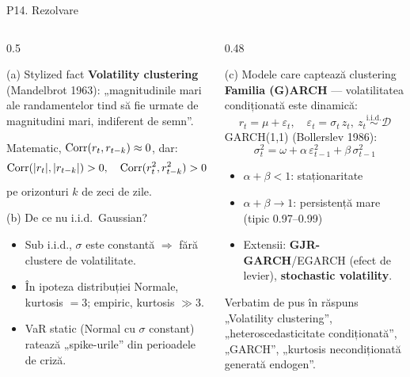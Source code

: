 \documentclass[9pt, aspectratio=169, t]{beamer}
\begin{document}
\begin{frame}[shrink=22]{P14. Rezolvare}
\begin{columns}[T]
\begin{column}{0.5\textwidth}
\begin{block}{(a) Stylized fact}
\textbf{Volatility clustering} (Mandelbrot 1963): „magnitudinile mari ale randamentelor tind să fie urmate de magnitudini mari, indiferent de semn''.

Matematic, $\text{Corr}(r_t,r_{t-k})\approx 0$, dar:
\[
\text{Corr}(|r_t|,|r_{t-k}|) > 0,\quad \text{Corr}(r_t^2,r_{t-k}^2) > 0
\]
pe orizonturi $k$ de zeci de zile.
\end{block}
\begin{block}{(b) De ce nu i.i.d.\ Gaussian?}
\begin{itemize}\setlength{\itemsep}{0pt}
\item Sub i.i.d., $\sigma$ este constantă $\Rightarrow$ fără clustere de volatilitate.
\item În ipoteza distribuției Normale, kurtosis $=3$; empiric, kurtosis $\gg 3$.
\item VaR static (Normal cu $\sigma$ constant) ratează „spike-urile'' din perioadele de criză.
\end{itemize}
\end{block}
\end{column}
\begin{column}{0.48\textwidth}
\begin{block}{(c) Modele care captează clustering}
\textbf{Familia (G)ARCH} --- volatilitatea condiționată este dinamică:
\[
r_t = \mu + \varepsilon_t,\quad \varepsilon_t = \sigma_t\, z_t,\ z_t\overset{\text{i.i.d.}}{\sim}\mathcal D
\]
GARCH(1,1) (Bollerslev 1986):
\[
\sigma_t^2 = \omega + \alpha\,\varepsilon_{t-1}^2 + \beta\,\sigma_{t-1}^2
\]
\begin{itemize}\setlength{\itemsep}{0pt}
\item $\alpha+\beta<1$: staționaritate
\item $\alpha+\beta\to 1$: persistență mare (tipic 0.97--0.99)
\item Extensii: \textbf{GJR-GARCH}/EGARCH (efect de levier), \textbf{stochastic volatility}.
\end{itemize}
\end{block}
\begin{alertblock}{Verbatim de pus în răspuns}
„Volatility clustering'', „heteroscedasticitate condiționată'', „GARCH'', „kurtosis necondiționată generată endogen''.
\end{alertblock}
\end{column}
\end{columns}
\end{frame}
\end{document}
